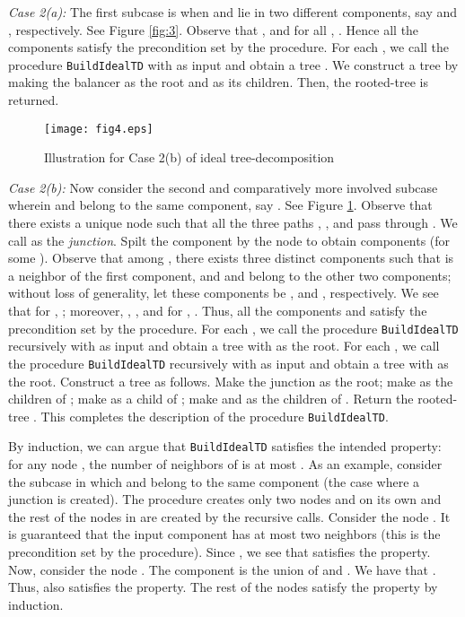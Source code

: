 \documentclass[11pt]{article}
\newcommand{\BuildITD} {{\tt BuildIdealTD}}
\begin{document}
{\it Case 2(a): }
The first subcase is when  and  lie in two different components, say  and , respectively. 
See Figure \ref{fig:3}.
Observe that ,  and for all ,
. Hence all the components  satisfy the precondition set by the procedure.
For each , we call the procedure {\BuildITD} with  as input and obtain 
a tree . We construct a tree  by making the balancer  as the root and  as its children. 
Then, the rooted-tree  is returned. 

\begin{figure}[t]
\centering
\texttt{[image: fig4.eps]}
\caption{Illustration for Case 2(b) of ideal tree-decomposition}
\label{fig:4}
\end{figure}

{\it Case 2(b): }
Now consider the second and comparatively more involved subcase wherein  and  belong to 
the same component, say . See Figure \ref{fig:4}.
Observe that there exists a unique node  such that all the three paths 
, , and  pass through . We call  as the {\em junction}.
Spilt the component  by the node  to obtain components  (for some ).
Observe that among , 
there exists three distinct components such that  is a neighbor of the first component,
and  and  belong to the other two components;
without loss of generality, let these components be ,  and , respectively.
We see that for , ; moreover,
, , 
and for , .
Thus, all the components  and 
satisfy the precondition set by the procedure.
For each , we call the procedure {\BuildITD} recursively with
 as input and obtain a tree  with  as the root.
For each , we call the procedure {\BuildITD} recursively with
 as input and obtain a tree  with  as the root.
Construct a tree  as follows. Make the junction  as the root;
make  as the children of ;
make  as a child of ; make  and  as the children of .
Return the rooted-tree . This completes the description of the procedure {\BuildITD}.

By induction, we can argue that {\BuildITD} satisfies the intended property:
for any node , the number of neighbors of  is at most .
As an example, consider the subcase in which  and  belong to the same component 
(the case where a junction  is created). The procedure creates only two nodes  and  on its own
and the rest of the nodes in  are created by the recursive calls. 
Consider the node .
It is guaranteed that the input component  has at most two neighbors (this is the precondition
set by the procedure). Since , we see that  satisfies the property.
Now, consider the node . The component  is the union 
of  and . We have that .
Thus,  also satisfies the property. The rest of the nodes satisfy the property by induction.
\end{document}
